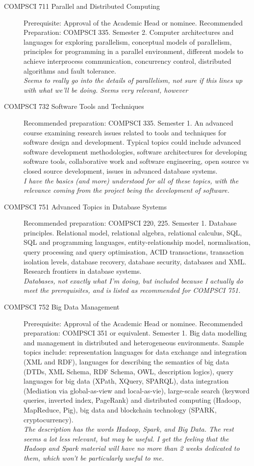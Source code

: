 \documentclass[10pt,a4paper]{article}
\begin{document}
\begin{description}
\item[COMPSCI 711 Parallel and Distributed Computing] Prerequisite: Approval of the Academic Head or nominee. Recommended Preparation: COMPSCI 335. Semester 2. Computer architectures and languages for exploring parallelism, conceptual models of parallelism, principles for programming in a parallel environment, different models to achieve interprocess communication, concurrency control, distributed algorithms and fault tolerance.\\
  \textit{Seems to really go into the details of parallelism, not sure if this lines up with what we'll be doing. Seems very relevant, however}
\item[COMPSCI 732 Software Tools and Techniques] Recommended preparation: COMPSCI 335. Semester 1. An advanced course examining research issues related to tools and techniques for software design and development. Typical topics could include advanced software development methodologies, software architectures for developing software tools, collaborative work and software engineering, open source vs closed source development, issues in advanced database systems.\\
  \textit{I have the basics (and more) understood for all of these topics, with the relevance coming from the project being the development of software.}
\item[COMPSCI 751 Advanced Topics in Database Systems] Recommended preparation: COMPSCI 220, 225. Semester 1. Database principles. Relational model, relational algebra, relational calculus, SQL, SQL and programming languages, entity-relationship model, normalisation, query processing and query optimisation, ACID transactions, transaction isolation levels, database recovery, database security, databases and XML. Research frontiers in database systems.\\
  \textit{Databases, not exactly what I'm doing, but included because I actually do meet the prerequisites, and is listed as recommended for COMPSCI 751.}
\item[COMPSCI 752 Big Data Management] Prerequisite: Approval of the Academic Head or nominee. Recommended preparation: COMPSCI 351 or equivalent. Semester 1. Big data modelling and management in distributed and heterogeneous environments. Sample topics include: representation languages for data exchange and integration (XML and RDF), languages for describing the semantics of big data (DTDs, XML Schema, RDF Schema, OWL, description logics), query languages for big data (XPath, XQuery, SPARQL), data integration (Mediation via global-as-view and local-as-vie), large-scale search (keyword queries, inverted index, PageRank) and distributed computing (Hadoop, MapReduce, Pig), big data and blockchain technology (SPARK, cryptocurrency).\\
  \textit{The description has the words Hadoop, Spark, and Big Data. The rest seems a lot less relevant, but may be useful. I get the feeling that the Hadoop and Spark material will have no more than 2 weeks dedicated to them, which won't be particularly useful to me.}
\end{description}
\end{document}
